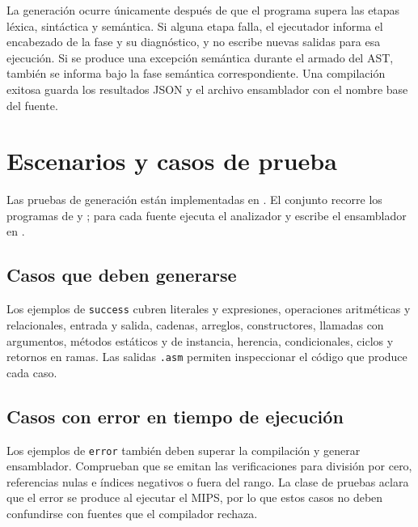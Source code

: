 La generación ocurre únicamente después de que el programa supera las
etapas léxica, sintáctica y semántica. Si alguna etapa falla, el
ejecutador informa el encabezado de la fase y su diagnóstico, y no
escribe nuevas salidas para esa ejecución. Si se produce una excepción
semántica durante el armado del AST, también se informa bajo la fase
semántica correspondiente. Una compilación exitosa guarda los resultados
JSON y el archivo ensamblador con el nombre base del fuente.

\section{Escenarios y casos de prueba}
\label{sec:casos-generacion}

Las pruebas de generación están implementadas en
. El conjunto recorre los programas de
 y
; para cada fuente ejecuta el
analizador y escribe el ensamblador en
.

\subsection{Casos que deben generarse}
Los ejemplos de \texttt{success} cubren literales y expresiones,
operaciones aritméticas y relacionales, entrada y salida, cadenas,
arreglos, constructores, llamadas con argumentos, métodos estáticos y
de instancia, herencia, condicionales, ciclos y retornos en ramas. Las
salidas \texttt{.asm} permiten inspeccionar el código que produce cada
caso.



\subsection{Casos con error en tiempo de ejecución}
Los ejemplos de \texttt{error} también deben superar la compilación y
generar ensamblador. Comprueban que se emitan las verificaciones para
división por cero, referencias nulas e índices negativos o fuera del
rango. La clase de pruebas aclara que el error se produce al ejecutar
el MIPS, por lo que estos casos no deben confundirse con fuentes que el
compilador rechaza.



\endgroup
